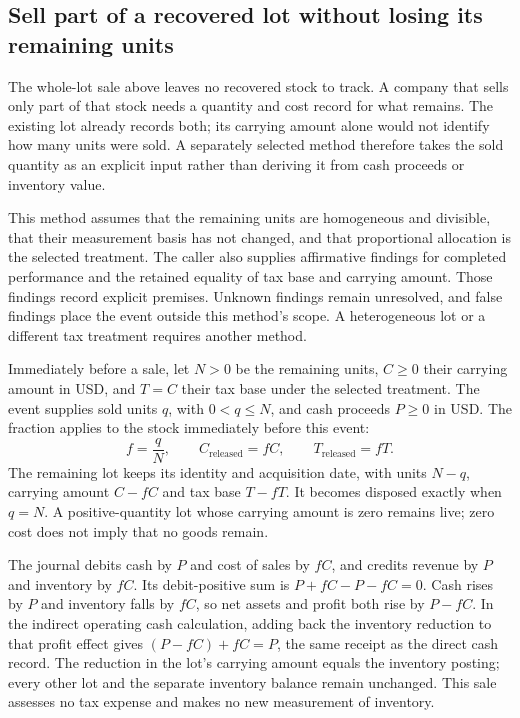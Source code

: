 
\subsection{Sell part of a recovered lot without losing its remaining units}
The whole-lot sale above leaves no recovered stock to track. A company that
sells only part of that stock needs a quantity and cost record for what remains.
The existing lot already records both; its carrying amount alone would not
identify how many units were sold. A separately selected method therefore
takes the sold quantity as an explicit input rather than deriving it from cash
proceeds or inventory value.

This method assumes that the remaining units are homogeneous and divisible,
that their measurement basis has not changed, and that proportional allocation
is the selected treatment. The caller also supplies affirmative findings for
completed performance and the retained equality of tax base and carrying
amount. Those findings record explicit premises. Unknown findings remain
unresolved, and false findings place the event outside this method's scope.
A heterogeneous lot or a different tax treatment requires another method.

Immediately before a sale, let $N>0$ be the remaining units, $C\geq0$ their
carrying amount in USD, and $T=C$ their tax base under the selected treatment.
The event supplies sold units $q$, with $0<q\leq N$, and cash proceeds $P\geq0$
in USD. The fraction applies to the stock immediately before this event:
\[
 f=\frac{q}{N},\qquad
 C_{\mathrm{released}}=fC,\qquad
 T_{\mathrm{released}}=fT.
\]
The remaining lot keeps its identity and acquisition date, with units $N-q$,
carrying amount $C-fC$ and tax base $T-fT$. It becomes disposed exactly when
$q=N$. A positive-quantity lot whose carrying amount is zero remains live;
zero cost does not imply that no goods remain.

The journal debits cash by $P$ and cost of sales by $fC$, and credits revenue
by $P$ and inventory by $fC$. Its debit-positive sum is
$P+fC-P-fC=0$. Cash rises by $P$ and inventory falls by $fC$, so net assets and
profit both rise by $P-fC$. In the indirect operating cash calculation, adding
back the inventory reduction to that profit effect gives
$(P-fC)+fC=P$, the same receipt as the direct cash record. The reduction in
the lot's carrying amount equals the inventory posting; every other lot and
the separate inventory balance remain unchanged. This sale assesses no tax
expense and makes no new measurement of inventory.

